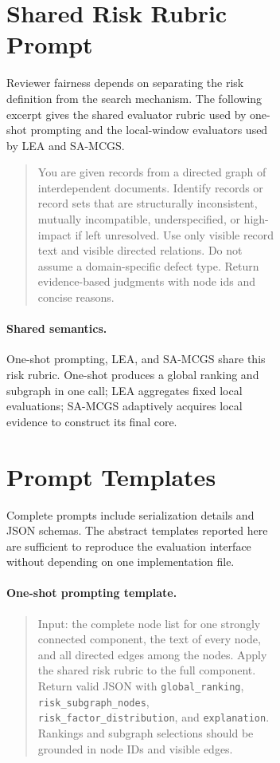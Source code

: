 \documentclass[11pt]{article}
\newcommand{\samcgs}{SA-MCGS}
\begin{document}
\begin{figure}[!t]
\begin{figure}[!t]
\section{Shared Risk Rubric Prompt}
\label{sec:appendix_shared_rubric}

Reviewer fairness depends on separating the risk definition from the search mechanism.  The following excerpt gives the shared evaluator rubric used by one-shot prompting and the local-window evaluators used by LEA and \samcgs{}.

\begin{quote}
\small
You are given records from a directed graph of interdependent documents.  Identify records or record sets that are structurally inconsistent, mutually incompatible, underspecified, or high-impact if left unresolved.  Use only visible record text and visible directed relations.  Do not assume a domain-specific defect type.  Return evidence-based judgments with node ids and concise reasons.
\end{quote}

\paragraph{Shared semantics.}
One-shot prompting, LEA, and \samcgs{} share this risk rubric. One-shot produces a global ranking and subgraph in one call; LEA aggregates fixed local evaluations; \samcgs{} adaptively acquires local evidence to construct its final core.

\section{Prompt Templates}
\label{sec:appendix_prompts}

Complete prompts include serialization details and JSON schemas.  The abstract templates reported here are sufficient to reproduce the evaluation interface without depending on one implementation file.

\paragraph{One-shot prompting template.}
\begin{quote}
\small
Input: the complete node list for one strongly connected component, the text of every node, and all directed edges among the nodes.  Apply the shared risk rubric to the full component.  Return valid JSON with \texttt{global\_ranking}, \texttt{risk\_subgraph\_nodes}, \texttt{risk\_factor\_distribution}, and \texttt{explanation}.  Rankings and subgraph selections should be grounded in node IDs and visible edges.
\end{quote}


\end{figure}
\end{figure}
\end{document}
